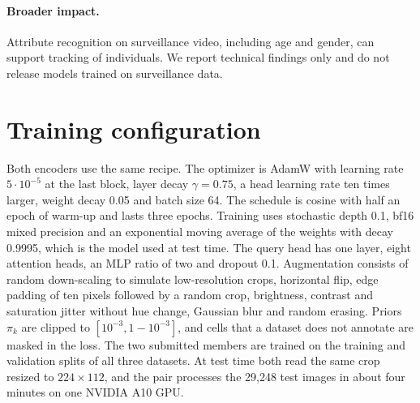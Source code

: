 \documentclass[10pt,twocolumn,letterpaper]{article}
\begin{document}
\paragraph{Broader impact.} Attribute recognition on surveillance video, including age and gender, can support tracking of individuals. We report technical findings only and do not release models trained on surveillance data.

{\small


}

\clearpage
\appendix
\section{Training configuration}
\label{app:config}

Both encoders use the same recipe. The optimizer is AdamW with learning rate $5\cdot10^{-5}$ at the last block, layer decay $\gamma=0.75$, a head learning rate ten times larger, weight decay 0.05 and batch size 64. The schedule is cosine with half an epoch of warm-up and lasts three epochs. Training uses stochastic depth 0.1, bf16 mixed precision and an exponential moving average of the weights with decay 0.9995, which is the model used at test time. The query head has one layer, eight attention heads, an MLP ratio of two and dropout 0.1. Augmentation consists of random down-scaling to simulate low-resolution crops, horizontal flip, edge padding of ten pixels followed by a random crop, brightness, contrast and saturation jitter without hue change, Gaussian blur and random erasing. Priors $\pi_k$ are clipped to $[10^{-3},1-10^{-3}]$, and cells that a dataset does not annotate are masked in the loss. The two submitted members are trained on the training and validation splits of all three datasets. At test time both read the same crop resized to $224\times112$, and the pair processes the 29{,}248 test images in about four minutes on one NVIDIA A10 GPU.
\end{document}
